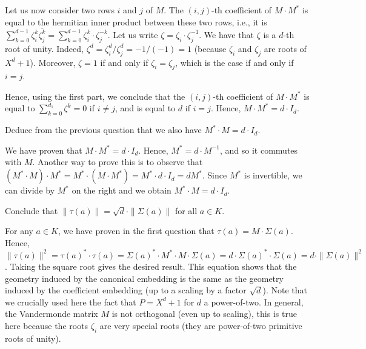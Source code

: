 \documentclass[11pt]{exam}
\theoremstyle{definition}
\begin{document}
\begin{questions}
\begin{solution}
Let us now consider two rows $i$ and $j$ of $M$. The $(i,j)$-th coefficient of $M \cdot M^*$ is equal to the hermitian inner product between these two rows, i.e., it is $\sum_{k = 0}^{d-1} \zeta_i^k \overline{\zeta_j^k} = \sum_{k = 0}^{d-1} \zeta_i^k \cdot \zeta_j^{-k}$. Let us write $\zeta = \zeta_i \cdot \zeta_j^{-1}$. We have that $\zeta$ is a $d$-th root of unity. Indeed, $\zeta^d = \zeta_i^d / \zeta_j^d = -1/(-1) = 1$ (because $\zeta_i$ and $\zeta_j$ are roots of $X^d+1$). Moreover, $\zeta = 1$ if and only if $\zeta_i = \zeta_j$, which is the case if and only if $i = j$.

Hence, using the first part, we conclude that the $(i,j)$-th coefficient of $M \cdot M^*$ is equal to $\sum_{k = 0}^{d_1} \zeta^k = 0$ if $i \neq j$, and is equal to $d$ if $i = j$. Hence, $M \cdot M^* = d \cdot I_d$.
\end{solution}

\question Deduce from the previous question that we also have $M^* \cdot M = d \cdot I_d$.

\begin{solution}
We have proven that $M \cdot M^* = d \cdot I_d$. Hence, $M^* = d \cdot M^{-1}$, and so it commutes with $M$. Another way to prove this is to observe that $(M^* \cdot M) \cdot M^* = M^* \cdot (M \cdot M^*) = M^* \cdot d \cdot I_d = d M^*$. Since $M^*$ is invertible, we can divide by $M^*$ on the right and we obtain $M^* \cdot M = d \cdot I_d$.
\end{solution}

\question Conclude that $\|\tau(a)\| = \sqrt{d} \cdot \|\Sigma(a)\|$ for all $a \in K$.

\begin{solution}
For any $a \in K$, we have proven in the first question that $\tau(a) = M \cdot \Sigma(a)$. Hence, $\|\tau(a)\|^2 = \tau(a)^* \cdot \tau(a) = \Sigma(a)^* \cdot M^* \cdot M \cdot \Sigma(a) = d \cdot \Sigma(a)^* \cdot \Sigma(a) = d \cdot \|\Sigma(a)\|^2$. Taking the square root gives the desired result.
This equation shows that the geometry induced by the canonical embedding is the same as the geometry induced by the coefficient embedding (up to a scaling by a factor $\sqrt{d}$). Note that we crucially used here the fact that $P = X^d+1$ for $d$ a power-of-two. In general, the Vandermonde matrix $M$ is not orthogonal (even up to scaling), this is true here because the roots $\zeta_i$ are very special roots (they are power-of-two primitive roots of unity).
\end{solution}

\end{questions}
\end{document}
